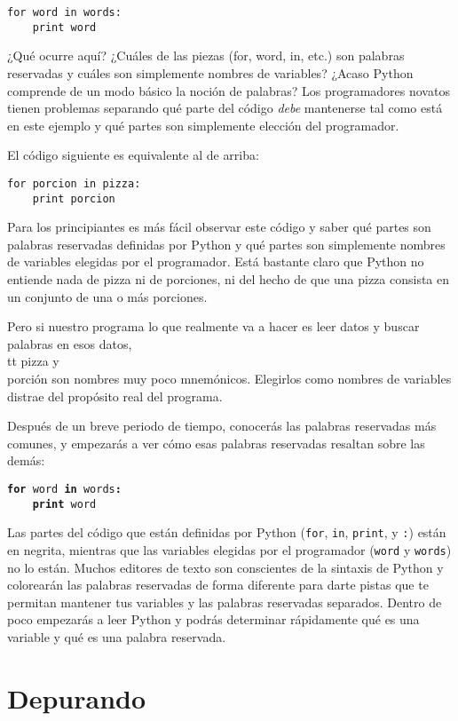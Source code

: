 \beforeverb
\begin{verbatim}
for word in words:
    print word
\end{verbatim}
\afterverb
%
¿Qué ocurre aquí? ¿Cuáles de las piezas (for, word, in, etc.) son palabras reservadas
y cuáles son simplemente nombres de variables? ¿Acaso Python comprende de un modo
básico la noción de palabras? Los programadores novatos tienen
problemas separando qué parte del código
\emph{debe} mantenerse tal como está en este ejemplo y qué partes son simplemente
elección del programador.

El código siguiente es equivalente al de arriba:

\beforeverb
\begin{verbatim}
for porcion in pizza:
    print porcion
\end{verbatim}
\afterverb
%
Para los principiantes es más fácil observar este código y saber qué partes
son palabras reservadas definidas por Python y qué partes son simplemente nombres
de variables elegidas por el programador. Está bastante claro que Python no
entiende nada de pizza ni de porciones,
ni del hecho de que una pizza consista en un conjunto de una o más porciones.

Pero si nuestro programa lo que realmente va a hacer es leer datos y buscar palabras en esos datos,
{\\tt pizza} y {\\ porción} son nombres muy poco mnemónicos. Elegirlos como
nombres de variables distrae del propósito real del programa.

Después de un breve periodo de tiempo, conocerás las palabras reservadas más comunes,
y empezarás a ver cómo esas palabras reservadas resaltan sobre las demás:

{\tt {\bf for} word {\bf in} words{\bf :}\\
\verb"    "{\bf print} word }

Las partes del código que están definidas por
Python ({\tt for}, {\tt in}, {\tt print}, y {\tt :}) están en negrita,
mientras que las variables elegidas por el programador ({\tt word} y {\tt words}) no lo están.
Muchos editores de texto son conscientes de la sintaxis de Python
y colorearán las palabras reservadas de forma diferente para darte pistas que te permitan
mantener tus variables y las palabras reservadas separados.
Dentro de poco empezarás a leer Python y podrás determinar rápidamente qué
es una variable y qué es una palabra reservada.

\section{Depurando}

